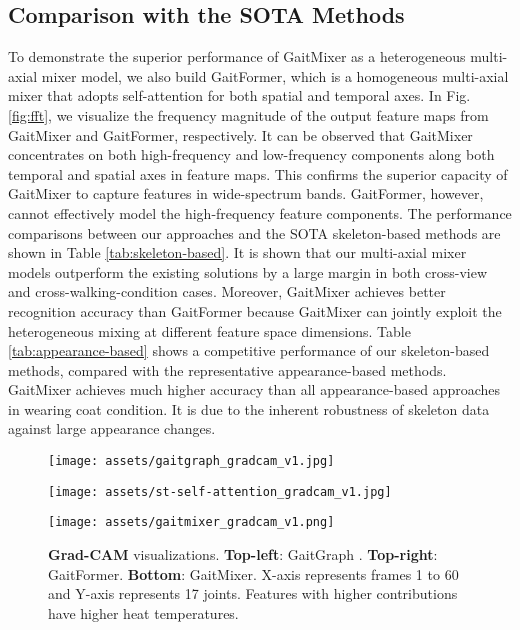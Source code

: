 \documentclass{article}
\begin{document}
\subsection{Comparison with the SOTA Methods}
To demonstrate the superior performance of GaitMixer as a heterogeneous multi-axial mixer model, we also build GaitFormer, which is a homogeneous multi-axial mixer that adopts self-attention for both spatial and temporal axes.
In Fig. \ref{fig:fft}, we visualize the frequency magnitude of the output feature maps from GaitMixer and GaitFormer, respectively. It can be observed that GaitMixer concentrates on both high-frequency and low-frequency components along both temporal and spatial axes in feature maps. This confirms the superior capacity of GaitMixer to capture features in wide-spectrum bands. GaitFormer, however, cannot effectively model the high-frequency feature components. The performance comparisons between our approaches and the SOTA skeleton-based methods are shown in Table \ref{tab:skeleton-based}. It is shown that our multi-axial mixer models outperform the existing solutions by a large margin in both cross-view and cross-walking-condition cases. Moreover, GaitMixer achieves better recognition accuracy than GaitFormer because GaitMixer can jointly exploit the heterogeneous mixing at different feature space dimensions. Table \ref{tab:appearance-based} shows a competitive performance of our skeleton-based methods, compared with the representative appearance-based methods. GaitMixer achieves much higher accuracy than all appearance-based approaches in wearing coat condition. It is due to the inherent robustness of skeleton data against large appearance changes.

 





\begin{figure}[t]
\begin{minipage}[b]{.47\linewidth}
  \centering
  \centerline{\texttt{[image: assets/gaitgraph\_gradcam\_v1.jpg]}}
\end{minipage}
\hfill
\begin{minipage}[b]{0.50\linewidth}
  \centering
  \centerline{\texttt{[image: assets/st-self-attention\_gradcam\_v1.jpg]}}
\end{minipage}
\begin{minipage}[b]{1\linewidth}
  \centering
  \centerline{\texttt{[image: assets/gaitmixer\_gradcam\_v1.png]}}
\end{minipage}
\caption{\textbf{Grad-CAM} \cite{Grad-CAM} visualizations. \textbf{Top-left}: GaitGraph \cite{GaitGraph}. \textbf{Top-right}: GaitFormer. \textbf{Bottom}: GaitMixer. X-axis represents frames 1 to 60 and Y-axis represents 17 joints. Features with higher contributions have higher heat temperatures.}
\label{fig:gradcam}
\end{figure}
\end{document}
